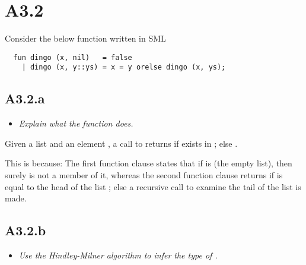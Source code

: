 \newpage
\section{A3.2}

Consider the below function written in SML

\begin{verbatim}
  fun dingo (x, nil)   = false
    | dingo (x, y::ys) = x = y orelse dingo (x, ys);

\end{verbatim}

\subsection{A3.2.a}

\begin{itemize}
  \item \emph{Explain what the function does.}
\end{itemize}

Given a list  and an element , a call to  returns
 if  exists in ; else .

\medskip

This is because: The first function clause states that if  is 
(the empty list), then surely  is not a member of it, whereas the second
function clause returns  if  is equal to the head of the list
; else a recursive call to examine the tail of the list is made.

\sectend


\subsection{A3.2.b}

\begin{itemize}
  \item \emph{Use the Hindley-Milner algorithm to infer the type of
    \emph{}.}
\end{itemize}

%
%
%

